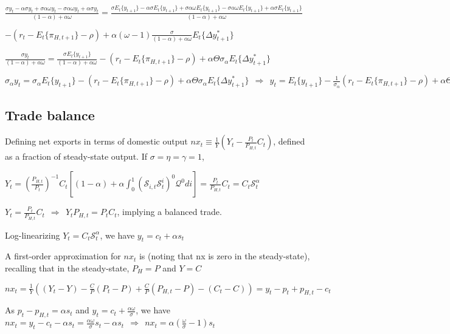 \documentclass[
]{article}
\begin{document}
\(\displaystyle \frac{\sigma y_t -\alpha \sigma y_t + \sigma \alpha \omega y_t -\sigma \alpha \omega y_t + \alpha \sigma y_t}{(1-\alpha)+\alpha \omega}= \frac{\sigma E_t\{y_{t+1}\} -\alpha \sigma E_t\{y_{t+1}\} + \sigma \alpha \omega E_t\{y_{t+1}\} -\sigma \alpha \omega E_t\{y_{t+1}\} + \alpha \sigma E_t\{y_{t+1}\}}{(1-\alpha)+\alpha \omega}\)

\(\displaystyle -(r_t-E_t\{\pi_{H,t+1}\} -\rho)+ \alpha (\omega-1) \frac{\sigma}{(1-\alpha)+\alpha \omega} E_t\{\Delta y_{t+1}^*\}\)

\(\displaystyle \frac{\sigma y_t}{(1-\alpha)+\alpha \omega}= \frac{\sigma E_t\{y_{t+1}\} }{(1-\alpha)+\alpha \omega}-(r_t-E_t\{\pi_{H,t+1}\} -\rho)+ \alpha \Theta \sigma_\alpha E_t\{\Delta y_{t+1}^*\}\)

\(\displaystyle \sigma_\alpha y_t= \sigma_\alpha E_t\{y_{t+1}\} -(r_t-E_t\{\pi_{H,t+1}\} -\rho)+ \alpha \Theta \sigma_\alpha E_t\{\Delta y_{t+1}^*\} \ \ \Rightarrow \ \  y_t= E_t\{y_{t+1}\} -\frac{1}{\sigma_\alpha}(r_t-E_t\{\pi_{H,t+1}\} -\rho)+ \alpha \Theta E_t\{\Delta y_{t+1}^*\}\)

\hypertarget{trade-balance}{%
\subsection{Trade balance}\label{trade-balance}}

Defining net exports in terms of domestic output
\(\displaystyle nx_t \equiv \frac{1}{Y}\left( Y_t - \frac{P_t}{P_{H,t}}C_t \right)\),
defined as a fraction of steady-state output. If
\(\sigma=\eta=\gamma=1\),

\(\displaystyle Y_t = \left( \frac{P_{H,t}}{P_t} \right)^{-1} C_t \left[ (1-\alpha) + \alpha \int_0^1 \left( \mathcal{S}_{i,t} \mathcal{S}_t^i\right)^{0} \mathcal{Q}^{0} di \right] = \frac{P_{t}}{P_{H,t}} C_t=C_t \mathcal{S}_t^\alpha\)

\(\displaystyle Y_t = \frac{P_{t}}{P_{H,t}} C_t \ \ \Rightarrow \ \ Y_t P_{H,t}=P_tC_t\),
implying a balanced trade.

Log-linearizing \(Y_t=C_t \mathcal{S}_t^\alpha\), we have
\(y_t = c_t + \alpha s_t\)

A first-order approximation for \(nx_t\) is (noting that nx is zero in
the steady-state), recalling that in the steady-state, \(P_H=P\) and
\(Y=C\)

\(\displaystyle nx_t = \frac{1}{Y} \left( (Y_t-Y)-\frac{C}{P}(P_t-P)+\frac{C}{P}(P_{H,t}-P) - (C_t-C) \right)=y_t-p_t+p_{H,t}-c_t\)

As \(p_t-p_{H,t}=\alpha s_t\) and
\(\displaystyle y_t = c_t+\frac{\alpha \omega}{\sigma}\), we have
\(\displaystyle nx_t=y_t-c_t-\alpha s_t= \frac{\alpha \omega}{\sigma}s_t - \alpha s_t \ \ \Rightarrow \ \ nx_t = \alpha \left(\frac{\omega}{\sigma} - 1 \right) s_t\)
\end{document}
